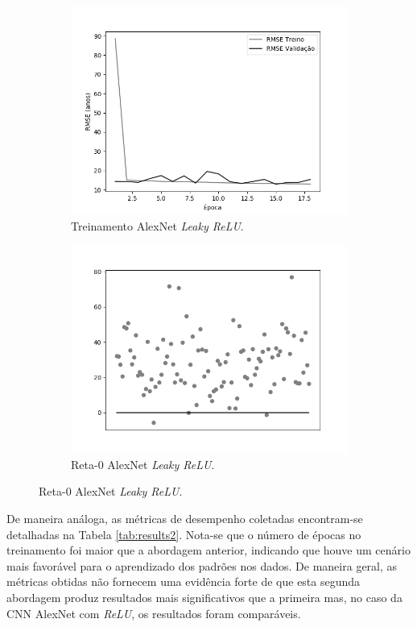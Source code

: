 \begin{figure}[h!]
\begin{subfigure}[hb]{0.5\linewidth}
			\caption{Treinamento AlexNet \emph{Leaky ReLU}.}
			\centering
			\includegraphics[width=\linewidth]{img/graficos/history/alexnet/fig-history-image-treat-2-alexnet-lrelu-rmse.png}
		\end{subfigure}
		\begin{subfigure}[hb]{0.5\linewidth}
			\caption{Reta-0 AlexNet \emph{Leaky ReLU}.}
			\includegraphics[width=\linewidth]{img/graficos/reta0/alexnet/fig-reta-0-image-treat-2-alexnet-lrelu.png}
		\end{subfigure}%
	\end{figure}

	De maneira análoga, as métricas de desempenho coletadas encontram-se detalhadas na Tabela \ref{tab:results2}. Nota-se que o número de épocas no treinamento foi maior que a abordagem anterior, indicando que houve um cenário mais favorável para o aprendizado dos padrões nos dados. De maneira geral, as métricas obtidas não fornecem uma evidência forte de que esta segunda abordagem produz resultados mais significativos que a primeira mas, no caso da CNN AlexNet com \emph{ReLU}, os resultados foram comparáveis.

